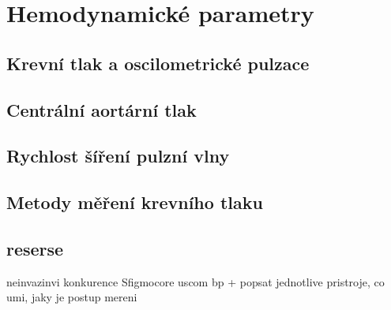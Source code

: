\chapter{Hemodynamické parametry}
\section{Krevní tlak a oscilometrické pulzace}
\section{Centrální aortární tlak}
\section{Rychlost šíření pulzní vlny}
\section{Metody měření krevního tlaku}

\section{reserse}
neinvazinvi konkurence 
Sfigmocore 
uscom bp +
popsat jednotlive pristroje, co umi, jaky je postup mereni
